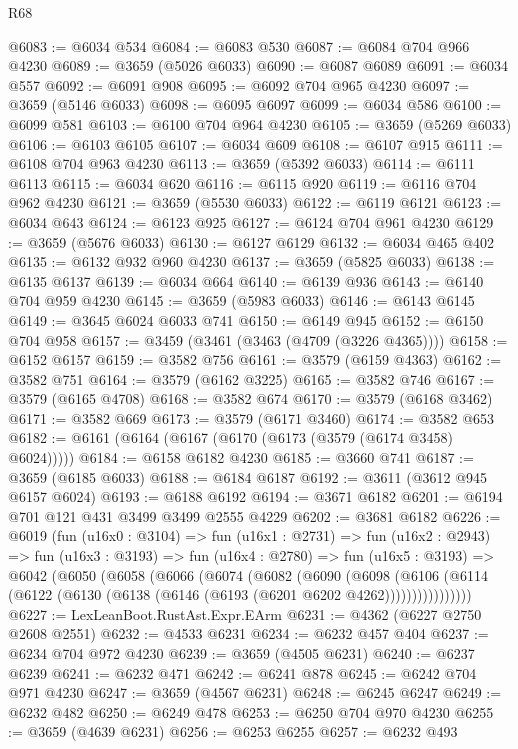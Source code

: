 \begin{lexlean}{R68}
\begin{coremodule}
@6083 := @6034 @534
@6084 := @6083 @530
@6087 := @6084 @704 @966 @4230
@6089 := @3659 (@5026 @6033)
@6090 := @6087 @6089
@6091 := @6034 @557
@6092 := @6091 @908
@6095 := @6092 @704 @965 @4230
@6097 := @3659 (@5146 @6033)
@6098 := @6095 @6097
@6099 := @6034 @586
@6100 := @6099 @581
@6103 := @6100 @704 @964 @4230
@6105 := @3659 (@5269 @6033)
@6106 := @6103 @6105
@6107 := @6034 @609
@6108 := @6107 @915
@6111 := @6108 @704 @963 @4230
@6113 := @3659 (@5392 @6033)
@6114 := @6111 @6113
@6115 := @6034 @620
@6116 := @6115 @920
@6119 := @6116 @704 @962 @4230
@6121 := @3659 (@5530 @6033)
@6122 := @6119 @6121
@6123 := @6034 @643
@6124 := @6123 @925
@6127 := @6124 @704 @961 @4230
@6129 := @3659 (@5676 @6033)
@6130 := @6127 @6129
@6132 := @6034 @465 @402
@6135 := @6132 @932 @960 @4230
@6137 := @3659 (@5825 @6033)
@6138 := @6135 @6137
@6139 := @6034 @664
@6140 := @6139 @936
@6143 := @6140 @704 @959 @4230
@6145 := @3659 (@5983 @6033)
@6146 := @6143 @6145
@6149 := @3645 @6024 @6033 @741
@6150 := @6149 @945
@6152 := @6150 @704 @958
@6157 := @3459 (@3461 (@3463 (@4709 (@3226 @4365))))
@6158 := @6152 @6157
@6159 := @3582 @756
@6161 := @3579 (@6159 @4363)
@6162 := @3582 @751
@6164 := @3579 (@6162 @3225)
@6165 := @3582 @746
@6167 := @3579 (@6165 @4708)
@6168 := @3582 @674
@6170 := @3579 (@6168 @3462)
@6171 := @3582 @669
@6173 := @3579 (@6171 @3460)
@6174 := @3582 @653
@6182 := @6161 (@6164 (@6167 (@6170 (@6173 (@3579 (@6174 @3458) @6024)))))
@6184 := @6158 @6182 @4230
@6185 := @3660 @741
@6187 := @3659 (@6185 @6033)
@6188 := @6184 @6187
@6192 := @3611 (@3612 @945 @6157 @6024)
@6193 := @6188 @6192
@6194 := @3671 @6182
@6201 := @6194 @701 @121 @431 @3499 @3499 @2555 @4229
@6202 := @3681 @6182
@6226 := @6019
    (fun (u16x0 : @3104) =>
    fun (u16x1 : @2731) =>
    fun (u16x2 : @2943) =>
    fun (u16x3 : @3193) =>
    fun (u16x4 : @2780) =>
    fun (u16x5 : @3193) =>
    @6042
      (@6050
        (@6058
          (@6066
            (@6074
              (@6082
                (@6090
                  (@6098
                    (@6106
                      (@6114 (@6122 (@6130 (@6138 (@6146 (@6193 (@6201 @6202 @4262))))))))))))))))
@6227 := LexLeanBoot.RustAst.Expr.EArm
@6231 := @4362 (@6227 @2750 @2608 @2551)
@6232 := @4533 @6231
@6234 := @6232 @457 @404
@6237 := @6234 @704 @972 @4230
@6239 := @3659 (@4505 @6231)
@6240 := @6237 @6239
@6241 := @6232 @471
@6242 := @6241 @878
@6245 := @6242 @704 @971 @4230
@6247 := @3659 (@4567 @6231)
@6248 := @6245 @6247
@6249 := @6232 @482
@6250 := @6249 @478
@6253 := @6250 @704 @970 @4230
@6255 := @3659 (@4639 @6231)
@6256 := @6253 @6255
@6257 := @6232 @493

\end{coremodule}
\end{lexlean}
